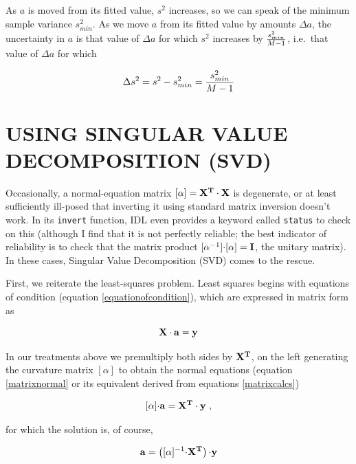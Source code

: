 \documentclass[psfig,preprint]{aastex}
\begin{document}
\noindent As $a$ is moved from its fitted value, $s^2$ increases, so we
can speak of the minimum sample variance $s_{min}^2$. As we move $a$
from its fitted value by amounts $\Delta a$, the uncertainty in $a$ is
that value of $\Delta a$ for which $s^2$ increases by $s_{min}^2 \over
M-1$, i.e.\ that value of $\Delta a$ for which

\begin{equation}
\Delta s^2 = s^2 - s_{min}^2 = {s_{min}^2 \over M-1}
\end{equation}

\section{USING SINGULAR VALUE DECOMPOSITION (SVD)} \label{SVD}

	Occasionally, a normal-equation matrix $[\alpha] = {\bf X^T
\cdot X}$ is degenerate, or at least sufficiently ill-posed that
inverting it using standard matrix inversion doesn't work.  In its
\verb$invert$ function, IDL even provides a keyword called \verb$status$
to check on this (although I find that it is not perfectly reliable; the
best indicator of reliability is to check that the matrix product
$[\alpha ^{-1}] {\bf \cdot} [\alpha] = {\bf I}$, the unitary matrix).
In these cases, Singular Value Decomposition (SVD) comes to the rescue.

	First, we reiterate the least-squares problem.  Least squares
begins with equations of condition (equation \ref{equationofcondition}),
which are expressed in matrix form as

\begin{equation} \label{eqnofcond}
{\bf X \cdot a} = {\bf y}
\end{equation}

\noindent In our treatments above we premultiply both sides by $\bf
X^T$, on the left generating the curvature matrix $[\alpha]$ to obtain
the normal equations (equation \ref{matrixnormal} or its equivalent
derived from equations \ref{matrixcalcs})

\begin{equation} \label{alphabeta1}
[\alpha] {\bf \cdot a} =  {\bf X^T \cdot y} \ ,
\end{equation}

\noindent for which the solution is, of course,

\begin{equation} \label{alphabeta2}
{\bf a} =  \left( [\alpha]^{-1} {\bf \cdot X^T} \right) {\bf \cdot y}
\end{equation}
\end{document}
